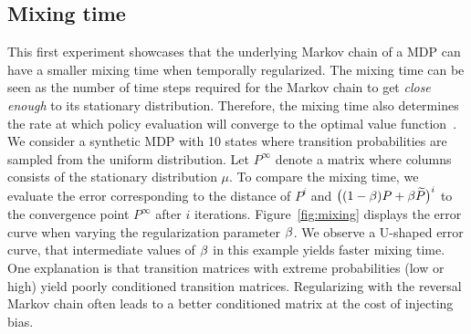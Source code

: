 \subsection{Mixing time}
This first experiment showcases that the underlying Markov chain of a MDP can have a smaller mixing time when temporally regularized. The mixing time can be seen as the number of time steps required for the Markov chain to get \emph{close enough} to its stationary distribution. Therefore, the mixing time also determines the rate at which policy evaluation will converge to the optimal value function~\citep{baxter2001infinite}. 
We consider a synthetic MDP with 10 states where transition probabilities are sampled from the uniform distribution. Let $P^{\infty}$ denote a matrix where columns consists of the stationary distribution $\mu$. To compare the mixing time, we evaluate the error corresponding to the distance of $P^i$ and $\big((1-\beta)P+\beta \widetilde{P}\big)^i$ to the convergence point $P^{\infty}$ after $i$ iterations.
%
Figure~\ref{fig:mixing} displays the error curve when varying the regularization parameter $\beta$. We observe a U-shaped error curve, that intermediate values of $\beta$ in this example yields faster mixing time.
One explanation is that transition matrices with extreme probabilities (low or high) yield poorly conditioned transition matrices. Regularizing with the reversal Markov chain often leads to a better conditioned matrix at the cost of injecting bias.
